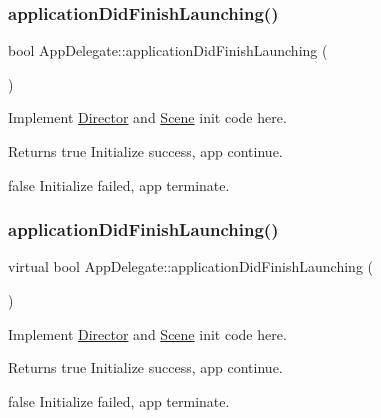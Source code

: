 \subsubsection{\texorpdfstring{application\+Did\+Finish\+Launching()}{applicationDidFinishLaunching()}\hspace{0.1cm}{\footnotesize\ttfamily [2/4]}}
{\footnotesize\ttfamily bool App\+Delegate\+::application\+Did\+Finish\+Launching (\begin{DoxyParamCaption}{ }\end{DoxyParamCaption})\hspace{0.3cm}{\ttfamily [virtual]}}



Implement \hyperlink{classDirector}{Director} and \hyperlink{classScene}{Scene} init code here. 

\begin{DoxyReturn}{Returns}
true Initialize success, app continue. 

false Initialize failed, app terminate. 
\end{DoxyReturn}
\mbox{\label{classAppDelegate_a05630e4484204b8e917ae7b8ac4bd6a3}} 
\subsubsection{\texorpdfstring{application\+Did\+Finish\+Launching()}{applicationDidFinishLaunching()}\hspace{0.1cm}{\footnotesize\ttfamily [3/4]}}
{\footnotesize\ttfamily virtual bool App\+Delegate\+::application\+Did\+Finish\+Launching (\begin{DoxyParamCaption}{ }\end{DoxyParamCaption})\hspace{0.3cm}{\ttfamily [virtual]}}



Implement \hyperlink{classDirector}{Director} and \hyperlink{classScene}{Scene} init code here. 

\begin{DoxyReturn}{Returns}
true Initialize success, app continue. 

false Initialize failed, app terminate. 
\end{DoxyReturn}
\mbox{\label{classAppDelegate_a05630e4484204b8e917ae7b8ac4bd6a3}} 
